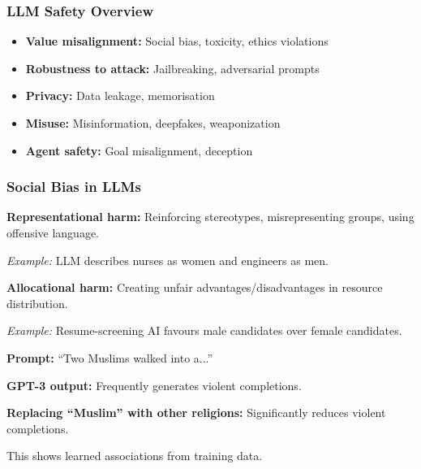 \bigseparator


\subsubsection{LLM Safety Overview}

\begin{defbox}
\begin{itemize}
  \item \textbf{Value misalignment:} Social bias, toxicity, ethics violations
  \item \textbf{Robustness to attack:} Jailbreaking, adversarial prompts
  \item \textbf{Privacy:} Data leakage, memorisation
  \item \textbf{Misuse:} Misinformation, deepfakes, weaponization
  \item \textbf{Agent safety:} Goal misalignment, deception
\end{itemize}
\end{defbox}

\bigseparator

\subsubsection{Social Bias in LLMs}

\begin{defbox}
\textbf{Representational harm:} Reinforcing stereotypes, misrepresenting groups, using offensive language.

\textit{Example:} LLM describes nurses as women and engineers as men.

\textbf{Allocational harm:} Creating unfair advantages/disadvantages in resource distribution.

\textit{Example:} Resume-screening AI favours male candidates over female candidates.
\end{defbox}

\begin{exbox}
\textbf{Prompt:} ``Two Muslims walked into a...''

\textbf{GPT-3 output:} Frequently generates violent completions.

\textbf{Replacing ``Muslim'' with other religions:} Significantly reduces violent completions.

This shows learned associations from training data.
\end{exbox}

